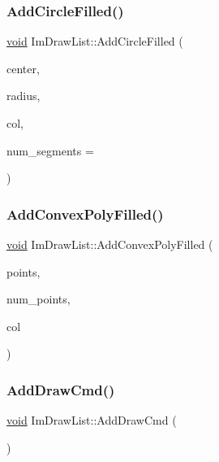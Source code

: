 \subsubsection{\texorpdfstring{Add\+Circle\+Filled()}{AddCircleFilled()}}
{\footnotesize\ttfamily \hyperlink{imgui__impl__opengl3__loader_8h_ac668e7cffd9e2e9cfee428b9b2f34fa7}{void} Im\+Draw\+List\+::\+Add\+Circle\+Filled (\begin{DoxyParamCaption}\item[{const \hyperlink{structImVec2}{Im\+Vec2} \&}]{center,  }\item[{float}]{radius,  }\item[{Im\+U32}]{col,  }\item[{int}]{num\+\_\+segments = {} }\end{DoxyParamCaption})}

\mbox{\label{structImDrawList_ad2accc0a74845b08bd0e6fae6183d6d0}} 
\subsubsection{\texorpdfstring{Add\+Convex\+Poly\+Filled()}{AddConvexPolyFilled()}}
{\footnotesize\ttfamily \hyperlink{imgui__impl__opengl3__loader_8h_ac668e7cffd9e2e9cfee428b9b2f34fa7}{void} Im\+Draw\+List\+::\+Add\+Convex\+Poly\+Filled (\begin{DoxyParamCaption}\item[{const \hyperlink{structImVec2}{Im\+Vec2} $\ast$}]{points,  }\item[{int}]{num\+\_\+points,  }\item[{Im\+U32}]{col }\end{DoxyParamCaption})}

\mbox{\label{structImDrawList_a846714bb0321c6f1f908767abc8559e6}} 
\subsubsection{\texorpdfstring{Add\+Draw\+Cmd()}{AddDrawCmd()}}
{\footnotesize\ttfamily \hyperlink{imgui__impl__opengl3__loader_8h_ac668e7cffd9e2e9cfee428b9b2f34fa7}{void} Im\+Draw\+List\+::\+Add\+Draw\+Cmd (\begin{DoxyParamCaption}{ }\end{DoxyParamCaption})}

